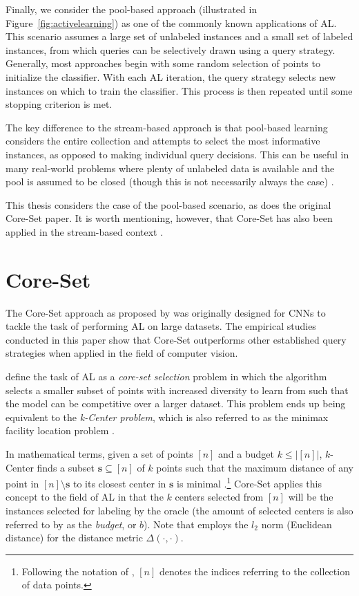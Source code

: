 \documentclass[english,bachelor,ul]{webisthesis} %
\begin{document}
Finally, we consider the pool-based approach (illustrated in Figure~\ref{fig:activelearning}) as one of the commonly known applications of AL. This scenario assumes a large set of unlabeled instances and a small set of labeled instances, from which queries can be selectively drawn using a query strategy. Generally, most approaches begin with some random selection of points to initialize the classifier. With each AL iteration, the query strategy selects new instances on which to train the classifier. This process is then repeated until some stopping criterion is met. 

The key difference to the stream-based approach is that pool-based learning considers the entire collection and attempts to select the most informative instances, as opposed to making individual query decisions. This can be useful in many real-world problems where plenty of unlabeled data is available and the pool is assumed to be closed (though this is not necessarily always the case) \citep{settles.tr09}.

This thesis considers the case of the pool-based scenario, as does the original Core-Set paper. It is worth mentioning, however, that Core-Set has also been applied in the stream-based context \citep{DBLP:conf/icml/SaranYK0A23}.

\section{Core-Set}

The Core-Set approach as proposed by \cite{DBLP:conf/iclr/SenerS18} was originally designed for CNNs to tackle the task of performing AL on large datasets. The empirical studies conducted in this paper show that Core-Set outperforms other established query strategies when applied in the field of computer vision.

\cite{DBLP:conf/iclr/SenerS18} define the task of AL as a \textit{core-set selection} problem in which the algorithm selects a smaller subset of points with increased diversity to learn from such that the model can be competitive over a larger dataset. This problem ends up being equivalent to the \textit{k-Center problem}, which is also referred to as the minimax facility location problem \citep{DBLP:conf/iclr/SenerS18}. 

In mathematical terms, given a set of points $ [n] $ and a budget $ k \leq |[n]| $, $k$-Center finds a subset $ \mathbf{s} \subseteq [n] $ of $ k $ points such that the maximum distance of any point in $ [n] \setminus \mathbf{s} $ to its closest center in $ \mathbf{s} $ is minimal \citep{har2008geometric}.\footnote{Following the notation of \cite{DBLP:conf/iclr/SenerS18}, $ [n] $ denotes the indices referring to the collection of data points.} Core-Set applies this concept to the field of AL in that the $ k $ centers selected from $ [n] $ will be the instances selected for labeling by the oracle (the amount of selected centers is also referred to by \cite{DBLP:conf/iclr/SenerS18} as the \textit{budget}, or $ b $). Note that \cite{DBLP:conf/iclr/SenerS18} employs the $ l_2 $ norm (Euclidean distance) for the distance metric $ \Delta(\cdot, \cdot) $. 
\end{document}
